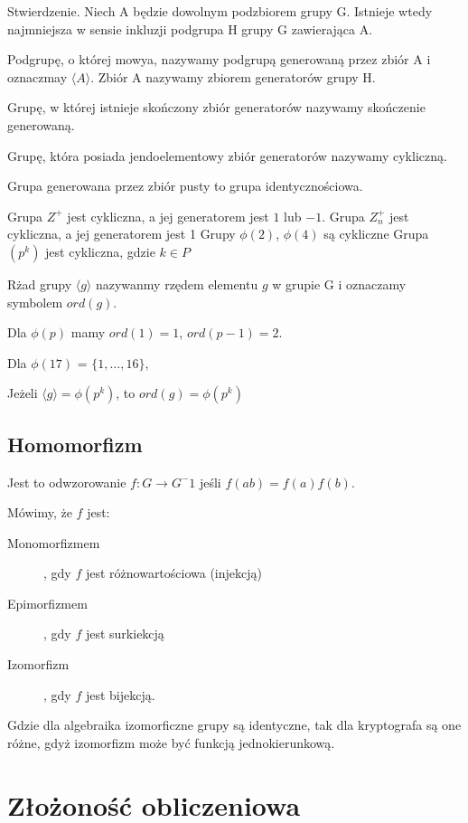 \documentclass{report}
\begin{document}

Stwierdzenie.
Niech A będzie dowolnym podzbiorem grupy G. Istnieje wtedy najmniejsza w sensie inkluzji podgrupa H grupy G zawierająca A.

Podgrupę, o której mowya, nazywamy podgrupą generowaną przez zbiór A i oznaczmay $\langle A \rangle$. Zbiór A nazywamy zbiorem generatorów grupy H.

Grupę, w której istnieje skończony zbiór generatorów nazywamy skończenie generowaną.

Grupę, która posiada jendoelementowy zbiór generatorów nazywamy cykliczną.

Grupa generowana przez zbiór pusty to grupa identycznościowa.

Grupa $Z^+$ jest cykliczna, a jej generatorem jest $1$ lub $-1$.
Grupa $Z_n^+$ jest cykliczna, a jej generatorem jest 1
Grupy $\phi(2)$, $\phi(4)$ są cykliczne
Grupa $(p^k)$ jest cykliczna, gdzie $k \in P$


Rżad grupy $\langle g \rangle$ nazywanmy rzędem elementu $g$ w grupie G i oznaczamy symbolem $ord(g)$.

Dla $\phi(p)$ mamy $ord(1) = 1$, $ord(p-1) = 2$.

Dla $\phi(17)$ = $\{ 1, \dots, 16 \}$,

Jeżeli $\langle g \rangle = \phi(p^k)$, to $ord(g) = \phi(p^k)$

\subsection{Homomorfizm}

Jest to odwzorowanie $f : G \to G^-1$ jeśli $f(ab) = f(a)f(b)$.

Mówimy, że $f$ jest:

\begin{description}
	\item[Monomorfizmem], gdy $f$ jest różnowartościowa (injekcją)
	\item[Epimorfizmem], gdy $f$ jest surkiekcją
	\item[Izomorfizm], gdy $f$ jest bijekcją.
\end{description}

Gdzie dla algebraika izomorficzne grupy są identyczne, tak dla kryptografa są one różne, gdyż izomorfizm może być funkcją jednokierunkową.

\section{Złożoność obliczeniowa}
\end{document}
